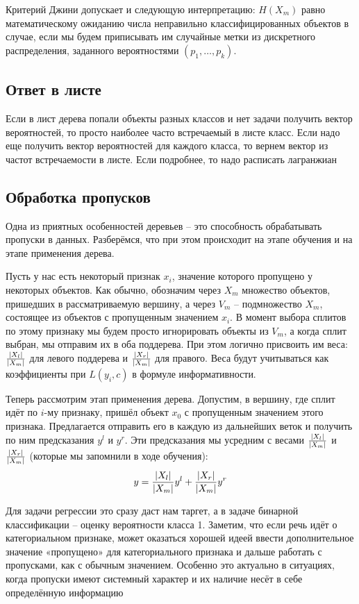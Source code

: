 Критерий Джини допускает и следующую интерпретацию: $H(X_m)$ равно математическому ожиданию числа неправильно
классифицированных объектов в случае, если мы будем приписывать им случайные метки из дискретного распределения,
заданного вероятностями $(p_1, \dots, p_k)$.

\subsection{Ответ в листе}

Если в лист дерева попали объекты разных классов и нет задачи получить вектор вероятностей, то просто наиболее
часто встречаемый в листе класс.
Если надо еще получить вектор вероятностей для каждого класса, то вернем вектор из частот встречаемости в листе.
Если подробнее, то надо расписать лагранжиан

\subsection{Обработка пропусков}

Одна из приятных особенностей деревьев -- это способность обрабатывать пропуски в данных.
Разберёмся, что при этом происходит на этапе обучения и на этапе применения дерева.

Пусть у нас есть некоторый признак $x_i$, значение которого пропущено у некоторых объектов.
Как обычно, обозначим через $X_m$ множество объектов, пришедших в рассматриваемую вершину, а через $V_m$
-- подмножество $X_m$, состоящее из объектов с пропущенным значением $x_i$.
В момент выбора сплитов по этому признаку мы будем просто игнорировать объекты из $V_m$, а когда сплит выбран, мы
отправим их в оба поддерева.
При этом логично присвоить им веса: $\frac{\abs{X_l}}{\abs{X_m}}$ для левого поддерева и
$\frac{\abs{X_r}}{\abs{X_m}}$ для правого.
Веса будут учитываться как коэффициенты при $L(y_i,c)$ в формуле информативности.

Теперь рассмотрим этап применения дерева.
Допустим, в вершину, где сплит идёт по $i$-му признаку, пришёл объект $x_0$ с пропущенным значением этого признака.
Предлагается отправить его в каждую из дальнейших веток и получить по ним предсказания $y^l$ и $y^r$.
Эти предсказания мы усредним с весами $\frac{\abs{X_l}}{\abs{X_m}}$ и $\frac{\abs{X_r}}{\abs{X_m}}$
(которые мы запомнили в ходе обучения):
\[ y = \frac{\abs{X_l}}{\abs{X_m}} y^l + \frac{\abs{X_r}}{\abs{X_m}} y^r \]

Для задачи регрессии это сразу даст нам таргет, а в задаче бинарной классификации -- оценку вероятности класса 1.
Заметим, что если речь идёт о категориальном признаке, может оказаться хорошей идеей ввести дополнительное значение
«пропущено» для категориального признака и дальше работать с пропусками, как с обычным значением.
Особенно это актуально в ситуациях, когда пропуски имеют системный характер и их наличие несёт в себе определённую
информацию

